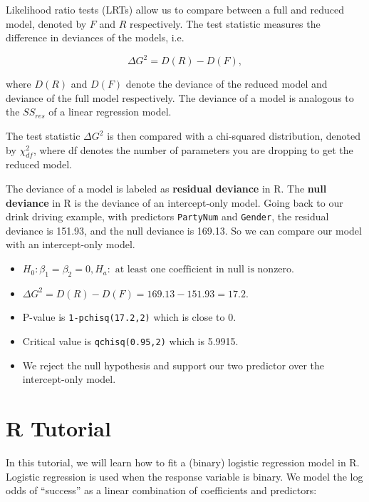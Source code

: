 \documentclass[
]{book}
\providecommand{\tightlist}{%
  \setlength{\itemsep}{0pt}\setlength{\parskip}{0pt}}
\begin{document}
Likelihood ratio tests (LRTs) allow us to compare between a full and reduced model, denoted by \(F\) and \(R\) respectively. The test statistic measures the difference in deviances of the models, i.e.

\begin{equation} 
\Delta G^2 = D(R) - D(F),
\label{eq:11LRT}
\end{equation}

where \(D(R)\) and \(D(F)\) denote the deviance of the reduced model and deviance of the full model respectively. The deviance of a model is analogous to the \(SS_{res}\) of a linear regression model.

The test statistic \(\Delta G^2\) is then compared with a chi-squared distribution, denoted by \(\chi^2_{df}\), where df denotes the number of parameters you are dropping to get the reduced model.

The deviance of a model is labeled as \textbf{residual deviance} in R. The \textbf{null deviance} in R is the deviance of an intercept-only model. Going back to our drink driving example, with predictors \texttt{PartyNum} and \texttt{Gender}, the residual deviance is 151.93, and the null deviance is 169.13. So we can compare our model with an intercept-only model.

\begin{itemize}
\tightlist
\item
  \(H_0: \beta_1 = \beta_2 = 0, H_a: \text{ at least one coefficient in null is nonzero.}\)
\item
  \(\Delta G^2 = D(R) - D(F) = 169.13 - 151.93 = 17.2\).
\item
  P-value is \texttt{1-pchisq(17.2,2)} which is close to 0.
\item
  Critical value is \texttt{qchisq(0.95,2)} which is 5.9915.
\item
  We reject the null hypothesis and support our two predictor over the intercept-only model.
\end{itemize}

\hypertarget{r-tutorial-8}{%
\section{R Tutorial}\label{r-tutorial-8}}

In this tutorial, we will learn how to fit a (binary) logistic regression model in R. Logistic regression is used when the response variable is binary. We model the log odds of ``success'' as a linear combination of coefficients and predictors:
\end{document}
